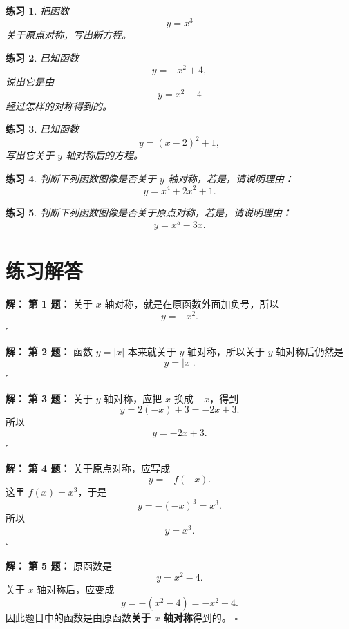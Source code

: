 \documentclass[11pt,a4paper,fontset=fandol]{ctexart}
\theoremstyle{formaltheorem}
\theoremstyle{formalexample}
\newtheorem{exercise}{练习}[section]
\newenvironment{solution}{\par\noindent\textbf{解：}}{\hfill$\square$\par}
\begin{document}
\begin{exercise}
把函数
\[
y=x^3
\]
关于原点对称，写出新方程。
\end{exercise}

\begin{exercise}
已知函数
\[
y=-x^2+4,
\]
说出它是由
\[
y=x^2-4
\]
经过怎样的对称得到的。
\end{exercise}

\begin{exercise}
已知函数
\[
y=(x-2)^2+1,
\]
写出它关于 $y$ 轴对称后的方程。
\end{exercise}

\begin{exercise}
判断下列函数图像是否关于 $y$ 轴对称，若是，请说明理由：
\[
y=x^4+2x^2+1.
\]
\end{exercise}

\begin{exercise}
判断下列函数图像是否关于原点对称，若是，请说明理由：
\[
y=x^5-3x.
\]
\end{exercise}

\section{练习解答}

\begin{solution}
\textbf{第 1 题：}
关于 $x$ 轴对称，就是在原函数外面加负号，所以
\[
\boxed{y=-x^2}.
\]
\end{solution}

\begin{solution}
\textbf{第 2 题：}
函数 $y=|x|$ 本来就关于 $y$ 轴对称，所以关于 $y$ 轴对称后仍然是
\[
\boxed{y=|x|}.
\]
\end{solution}

\begin{solution}
\textbf{第 3 题：}
关于 $y$ 轴对称，应把 $x$ 换成 $-x$，得到
\[
y=2(-x)+3=-2x+3.
\]
所以
\[
\boxed{y=-2x+3}.
\]
\end{solution}

\begin{solution}
\textbf{第 4 题：}
关于原点对称，应写成
\[
y=-f(-x).
\]
这里 $f(x)=x^3$，于是
\[
y=-(-x)^3=x^3.
\]
所以
\[
\boxed{y=x^3}.
\]
\end{solution}

\begin{solution}
\textbf{第 5 题：}
原函数是
\[
y=x^2-4.
\]
关于 $x$ 轴对称后，应变成
\[
y=-(x^2-4)=-x^2+4.
\]
因此题目中的函数是由原函数\textbf{关于 $x$ 轴对称}得到的。
\end{solution}
\end{document}
